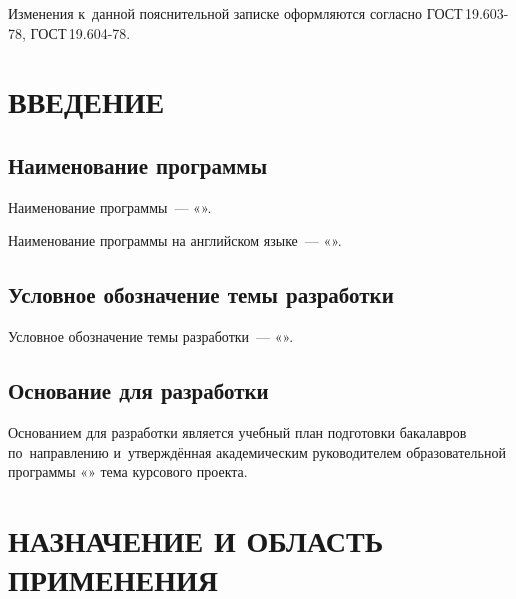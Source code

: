 \documentclass[12pt,a4paper]{extarticle}
\begin{document}
Изменения к~данной пояснительной записке оформляются согласно ГОСТ\,19.603-78\cite{gost19603}, ГОСТ\,19.604-78\cite{gost19604}.

\clearpage

\hypersetup{linkcolor=black}
\tableofcontents
\hypersetup{linkcolor=blue}
\thispagestyle{fancy}
\clearpage

\section{ВВЕДЕНИЕ}

\subsection{Наименование программы}

Наименование программы~--- «\projectname».

Наименование программы на английском языке~--- «\hseProjectNameEn».

\subsection{Условное обозначение темы разработки}

Условное обозначение темы разработки~--- «\hseProjectNameShort».

\subsection{Основание для разработки}

Основанием для разработки является учебный план подготовки бакалавров по~направлению  и~утверждённая академическим руководителем образовательной программы «\hseSpecialization» тема курсового проекта.

\clearpage

\section{НАЗНАЧЕНИЕ И ОБЛАСТЬ ПРИМЕНЕНИЯ}
\end{document}
